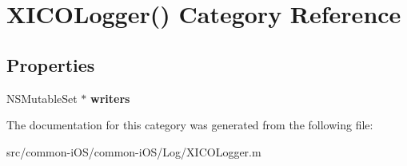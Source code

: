 \hypertarget{category_x_i_c_o_logger_07_08}{}\section{X\+I\+C\+O\+Logger() Category Reference}
\label{category_x_i_c_o_logger_07_08}
\subsection*{Properties}
\begin{DoxyCompactItemize}
\item 
\hypertarget{category_x_i_c_o_logger_07_08_a6a9c322105bf5aa8655289301d6453bf}{}\label{category_x_i_c_o_logger_07_08_a6a9c322105bf5aa8655289301d6453bf} 
N\+S\+Mutable\+Set $\ast$ {\bfseries writers}
\end{DoxyCompactItemize}


The documentation for this category was generated from the following file\+:\begin{DoxyCompactItemize}
\item 
src/common-\/i\+O\+S/common-\/i\+O\+S/\+Log/X\+I\+C\+O\+Logger.\+m\end{DoxyCompactItemize}
